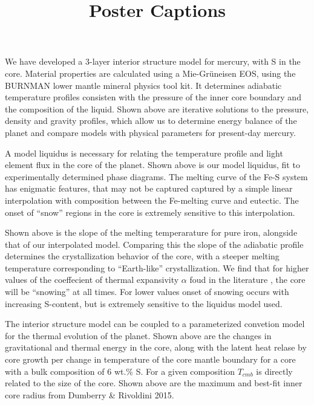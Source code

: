 \documentclass[a4paper,10pt]{article}
\title{Poster Captions}
\author{}
\date{}
\begin{document}
\maketitle


We have developed a 3-layer interior structure model for mercury, with S in the core.
Material properties are calculated using a Mie-Gr\"{u}neisen EOS, using the BURNMAN
lower mantle mineral physics tool kit. It determines adiabatic temperature profiles
consisten with the pressure of the inner core boundary and the composition of the
liquid. Shown above are iterative solutions to the pressure, density and gravity
profiles, which allow us to determine energy balance of the planet and compare models
with physical parameters for present-day mercury.

A model liquidus is necessary for relating the temperature profile and light element
flux in the core of the planet. Shown above is our model liquidus, fit to
experimentally determined phase diagrams. The melting curve of the Fe-S system has
enigmatic features, that may not be captured captured by a simple linear
interpolation with composition between the Fe-melting curve and eutectic. The onset
of ``snow'' regions in the core is extremely sensitive to this interpolation.

Shown above is the slope of the melting temperarature for pure iron, alongside that
of our interpolated model. Comparing this the slope of the adiabatic profile
determines the crystallization behavior of the core, with a steeper melting
temperature corresponding to  ``Earth-like'' crystallization. We find that for higher
values of the coeffecient of thermal expansivity $\alpha$ foud in the literature
, the core will be ``snowing'' at all times. For lower values
onset of snowing occurs with increasing S-content, but is extremely sensitive to the
liquidus model used.

The interior structure model can be coupled to a parameterized convetion model for
the thermal evolution of the planet. Shown above are the changes in gravitational
and thermal energy in the core, along with the latent heat relase by core growth per
change in temperature of the core mantle boundary for a core with a bulk composition
of 6 wt.\% S. For a given composition $T_{cmb}$ is directly related to the size of
the core. Shown above are the maximum and best-fit inner core radius from
Dumberry \& Rivoldini 2015.
\end{document}
